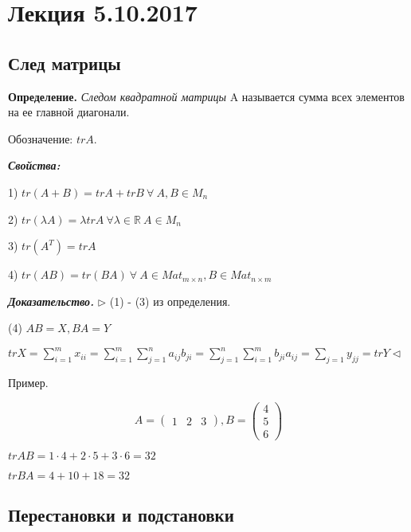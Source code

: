 \section{Лекция 5.10.2017}

\subsection{След матрицы}

\textbf{Определение.} \textit{Следом квадратной матрицы} A называется сумма всех элементов на ее главной диагонали.

Обозначение: $trA$.

\vspace{\baselineskip}
\textbf{\textit{Свойства:}}

1) $tr(A + B) = trA + trB \ \forall \ A, B \in M_n$

\vspace{\baselineskip}
2) $tr(\lambda A) = \lambda trA \ \forall \lambda \in \mathbb{R} \ A \in M_n$

\vspace{\baselineskip}
3) $tr(A^T) = trA$

\vspace{\baselineskip}
4) $tr(AB) = tr(BA) \ \forall \ A \in Mat_{m \times n}, B \in Mat_{n \times m}$

\vspace{\baselineskip}
\textbf{\textit{Доказательство.}} $\rhd$ (1) - (3) из определения.

(4) $AB = X, BA = Y$

$trX = \sum\limits_{i = 1}^m x_{ii} = \sum\limits_{i = 1}^m \sum\limits_{j = 1}^n a_{ij} b_{ji} = \sum\limits_{j = 1}^n \sum\limits_{i = 1}^m b_{ji} a_{ij} = \sum\limits_{j = 1} y_{jj} = trY \lhd$

\vspace{\baselineskip}
Пример.

\[A = \begin{pmatrix} 1 & 2 & 3 \end{pmatrix}, B = \begin{pmatrix} 4 \\ 5 \\ 6 \end{pmatrix} \]

$trAB = 1 \cdot 4 + 2 \cdot 5 + 3 \cdot 6 = 32$

$trBA = 4 + 10 + 18 = 32$

\subsection{Перестановки и подстановки}

